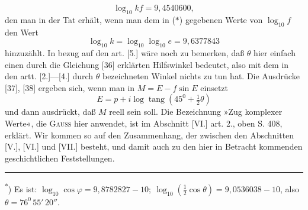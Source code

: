 \[\log_{10}kf=9{,}4540600,\]
\noindent den man in der Tat erhält, wenn man dem in (\(\ast\)) gegebenen Werte von \(\log_{10}f\) den Wert
\[\log_{10}k=\log_{10}\log_{10}e=9{,}6377843\]
\noindent hinzuzählt. In bezug auf den art. [5.] wäre noch zu bemerken, daß \(\theta\) hier einfach einen durch die Gleichung [36] erklärten Hilfswinkel bedeutet, also mit dem in den artt. [2.]—[4.] durch \(\theta\) bezeichneten Winkel nichts zu tun hat. Die Ausdrücke [37], [38] ergeben sich, wenn man in \(M=E-f\sin E\) einsetzt
\[E=p+i\log\operatorname{tang}(45^0+\tfrac12\theta)\]
\noindent und dann ausdrückt, daß \(M\) reell sein soll. Die Bezeichnung »Zug komplexer Werte«, die \textsc{Gauss} hier anwendet, ist im Abschnitt [VI.] art. 2., oben S. 408, erklärt. Wir kommen so auf den Zusammenhang, der zwischen den Abschnitten [V.], [VI.] und [VII.] besteht, und damit auch zu den hier in Betracht kommenden geschichtlichen Feststellungen.
\par\medskip\noindent\rule{.24\linewidth}{.4pt}\par\smallskip
\noindent\hspace*{\parindent}\textsuperscript{*}) Es ist: \(\log_{10}\cos\varphi=9{,}8782827-10;\ \log_{10}(\frac12\cos\theta)=9{,}0536038-10\), also \(\theta=76^0\,55'\,20''\).
\par\endgroup
{}
